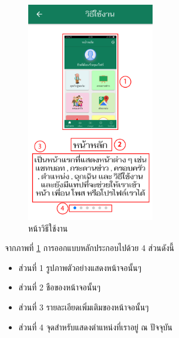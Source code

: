 		\begin{figure}[H]
			\centering
			\includegraphics[width=0.5\textwidth]{Figures/3/UI/howto}
			\caption{หน้าวิธีใช้งาน}
			\label{Fig:วิธีใช้งาน}
		\end{figure}
		จากภาพที่ \ref{Fig:วิธีใช้งาน} การออกแบบหลักประกอบไปด้วย 4 ส่วนดังนี้
		\begin{itemize}
			\item ส่วนที่ 1 รูปภาพตัวอย่างแสดงหน้าจอนั้นๆ
			\item ส่วนที่ 2 ชือของหน้าจอนั้นๆ
			\item ส่วนที่ 3 รายละเอียดเพิ่มเติมของหน้าจอนั้นๆ
			\item ส่วนที่ 4 จุดสำหรับแสดงตำแหน่งที่เราอยู่ ณ ปัจจุบัน
		\end{itemize}

